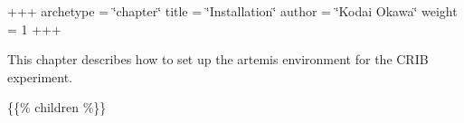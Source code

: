 +++ archetype = \char`\"{}chapter\char`\"{} title = \char`\"{}\+Installation\char`\"{} author = \char`\"{}\+Kodai Okawa\char`\"{} weight = 1 +++

This chapter describes how to set up the artemis environment for the CRIB experiment.

\{\{\% children \%\}\} 